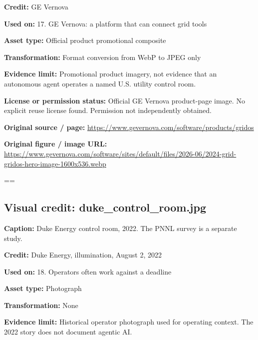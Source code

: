 \documentclass[10pt,letterpaper]{article}
\begin{document}
\textbf{Credit:} GE Vernova\par
\textbf{Used on:} 17. GE Vernova: a platform that can connect grid tools\par
\textbf{Asset type:} Official product promotional composite\par
\textbf{Transformation:} Format conversion from WebP to JPEG only\par
\textbf{Evidence limit:} Promotional product imagery, not evidence that an autonomous agent operates a named U.S. utility control room.\par
\textbf{License or permission status:} Official GE Vernova product-page image. No explicit reuse license found. Permission not independently obtained.\par
\textbf{Original source / page:} \href{https://www.gevernova.com/software/products/gridos}{\small\ttfamily https:/\allowbreak{}/\allowbreak{}www.\allowbreak{}gevernova.\allowbreak{}com/\allowbreak{}software/\allowbreak{}products/\allowbreak{}gridos}\par
\textbf{Original figure / image URL:} \href{https://www.gevernova.com/software/sites/default/files/2026-06/2024-grid-gridos-hero-image-1600x536.webp}{\small\ttfamily https:/\allowbreak{}/\allowbreak{}www.\allowbreak{}gevernova.\allowbreak{}com/\allowbreak{}software/\allowbreak{}sites/\allowbreak{}default/\allowbreak{}files/\allowbreak{}2026-\allowbreak{}06/\allowbreak{}2024-\allowbreak{}grid-\allowbreak{}gridos-\allowbreak{}hero-\allowbreak{}image-\allowbreak{}1600x536.\allowbreak{}webp}\par
\egroup\par\noindent\box\readingEntry\par\medskip
\setbox\readingEntry=\vbox\bgroup\hsize=\linewidth\subsection*{Visual credit: duke\_control\_room.jpg}
\textbf{Caption:} Duke Energy control room, 2022. The PNNL survey is a separate study.\par
\textbf{Credit:} Duke Energy, illumination, August 2, 2022\par
\textbf{Used on:} 18. Operators often work against a deadline\par
\textbf{Asset type:} Photograph\par
\textbf{Transformation:} None\par
\textbf{Evidence limit:} Historical operator photograph used for operating context. The 2022 story does not document agentic AI.\par
\end{document}
